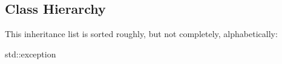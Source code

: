 \subsection{Class Hierarchy}
This inheritance list is sorted roughly, but not completely, alphabetically\-:\begin{DoxyCompactList}
\item std\-:\-:exception\begin{DoxyCompactList}
\item {}
\end{DoxyCompactList}
\end{DoxyCompactList}
